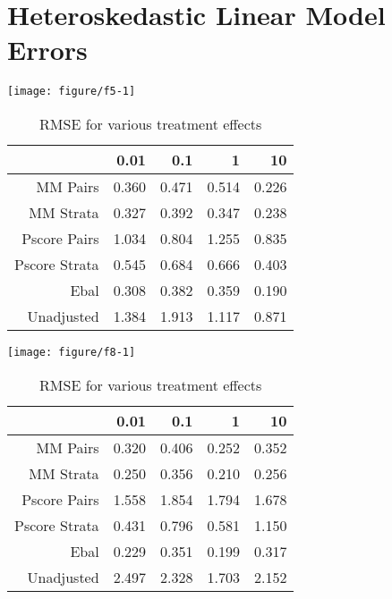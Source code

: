 \documentclass[11pt]{article}\usepackage[]{graphicx}\usepackage[]{color}
\makeatletter
\def\maxwidth{ %
  \ifdim\Gin@nat@width>\linewidth
    \linewidth
  \else
    \Gin@nat@width
  \fi
}
\newenvironment{knitrout}{}{} %
\makeatother
\begin{document}
\section{Heteroskedastic Linear Model Errors}
\begin{knitrout}
\color{fgcolor}

{\centering \texttt{[image: figure/f5-1]} 

}



\end{knitrout}
\begin{table}[ht]
\centering
\begin{tabular}{rrrrr}
  \hline
 & 0.01 & 0.1 & 1 & 10 \\ 
  \hline
MM Pairs & 0.360 & 0.471 & 0.514 & 0.226 \\ 
  MM Strata & 0.327 & 0.392 & 0.347 & 0.238 \\ 
  Pscore Pairs & 1.034 & 0.804 & 1.255 & 0.835 \\ 
  Pscore Strata & 0.545 & 0.684 & 0.666 & 0.403 \\ 
  Ebal & 0.308 & 0.382 & 0.359 & 0.190 \\ 
  Unadjusted & 1.384 & 1.913 & 1.117 & 0.871 \\ 
   \hline
\end{tabular}
\caption{RMSE for various treatment effects} 
\label{tab:f5}
\end{table}


\begin{knitrout}
\color{fgcolor}

{\centering \texttt{[image: figure/f8-1]} 

}



\end{knitrout}
\begin{table}[ht]
\centering
\begin{tabular}{rrrrr}
  \hline
 & 0.01 & 0.1 & 1 & 10 \\ 
  \hline
MM Pairs & 0.320 & 0.406 & 0.252 & 0.352 \\ 
  MM Strata & 0.250 & 0.356 & 0.210 & 0.256 \\ 
  Pscore Pairs & 1.558 & 1.854 & 1.794 & 1.678 \\ 
  Pscore Strata & 0.431 & 0.796 & 0.581 & 1.150 \\ 
  Ebal & 0.229 & 0.351 & 0.199 & 0.317 \\ 
  Unadjusted & 2.497 & 2.328 & 1.703 & 2.152 \\ 
   \hline
\end{tabular}
\caption{RMSE for various treatment effects} 
\label{tab:f8}
\end{table}
\end{document}
